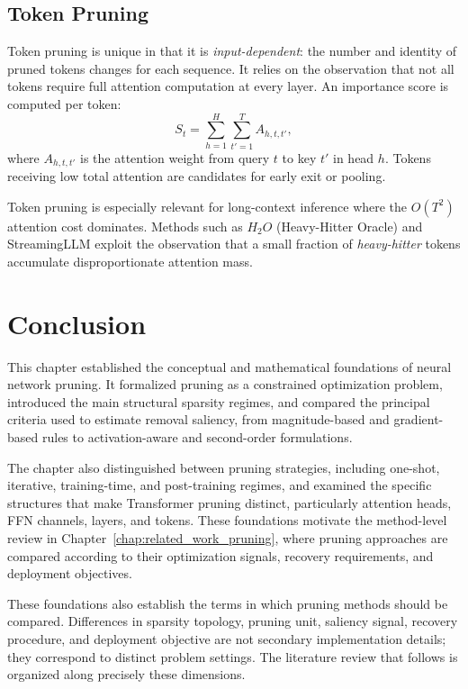 \subsection{Token Pruning}

Token pruning is unique in that it is \emph{input-dependent}: the number and
identity of pruned tokens changes for each sequence. It relies on the
observation that not all tokens require full attention computation at every
layer. An
importance score is computed per token:
\begin{equation}
	S_t = \sum_{h=1}^{H} \sum_{t'=1}^{T} A_{h,t,t'},
	\label{eq:token_score}
\end{equation}
where $A_{h,t,t'}$ is the attention weight from query $t$ to key $t'$ in head
$h$.  Tokens receiving low total attention are candidates for early exit or
pooling.

Token pruning is especially relevant for long-context inference where the
$O(T^2)$ attention cost dominates.  Methods such as $H_2O$ (Heavy-Hitter
Oracle) and StreamingLLM exploit the observation that a small fraction of
\emph{heavy-hitter} tokens accumulate disproportionate attention mass.

\section{Conclusion}

This chapter established the conceptual and mathematical foundations of neural
network pruning. It formalized pruning as a constrained optimization problem,
introduced the main structural sparsity regimes, and compared the principal
criteria used to estimate removal saliency, from magnitude-based and
gradient-based rules to activation-aware and second-order formulations.

\noindent The chapter also distinguished between pruning strategies, including
one-shot, iterative, training-time, and post-training regimes, and examined the
specific structures that make Transformer pruning distinct, particularly
attention heads, FFN channels, layers, and tokens. These foundations motivate
the method-level review in Chapter~\ref{chap:related_work_pruning}, where pruning approaches are
compared according to their optimization signals, recovery requirements, and
deployment objectives.

\noindent These foundations also establish the terms in which pruning methods
should be compared. Differences in sparsity topology, pruning unit, saliency
signal, recovery procedure, and deployment objective are not secondary
implementation details; they correspond to distinct problem settings. The
literature review that follows is organized along precisely these dimensions.
